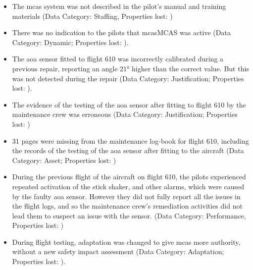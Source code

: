 \begin{itemize}
    \item The \gls{mcas} system was not described in the pilot's manual and training materials (Data Category: Staffing, Properties lost: )
    \item There was no indication to the pilots that \gls{mcas}MCAS was active (Data Category: Dynamic; Properties lost: ).
    \item The \gls{aoa} sensor fitted to flight 610 was incorrectly calibrated during a previous repair,
      reporting an angle 21° higher than the correct value.
      But this was not detected during the repair
      (Data Category: Justification; Properties lost: ).
    \item The evidence of the testing of the \gls{aoa} sensor after fitting to flight 610 by the maintenance crew was erroneous (Data Category: Justification; Properties lost: )
    \item 31 pages were missing from the maintenance log-book for flight 610, including the records of the testing of the \gls{aoa} sensor after fitting to the aircraft (Data Category: Asset; Properties lost: )
    \item During the previous flight of the aircraft on flight 610, the pilots experienced repeated activation of the stick shaker, and other alarms, which were caused by the faulty \gls{aoa} sensor.
      However they did not fully report all the issues in the flight logs, and so the maintenance crew's remediation activities did not lead them to suspect an issue with the sensor. (Data Category: Performance, Properties lost: )
    \item During flight testing, adaptation was changed to give \gls{mcas} more authority, without a new safety impact assessment (Data Category: Adaptation; Properties lost: ).
\end{itemize}

